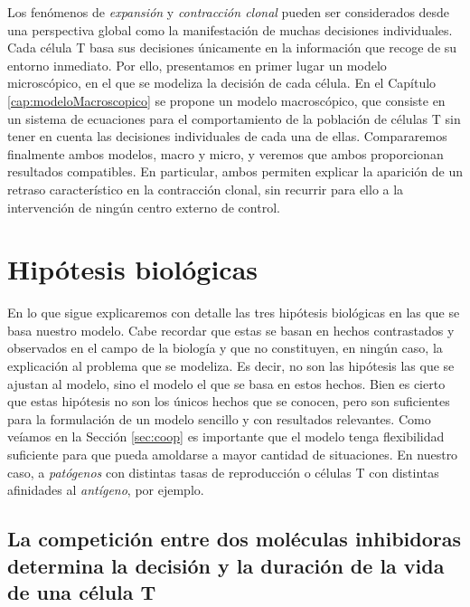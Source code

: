 Los fenómenos de \textit{expansión} y \textit{contracción clonal} pueden ser considerados desde una perspectiva global como la manifestación de muchas decisiones individuales. Cada célula T basa sus decisiones únicamente en la información que recoge de su entorno inmediato. Por ello, presentamos en primer lugar un modelo microscópico, en el que se modeliza la decisión de cada célula. En el Capítulo \ref{cap:modeloMacroscopico} se propone un modelo macroscópico, que consiste en un sistema de ecuaciones para el comportamiento de la población de células T sin tener en cuenta  las decisiones individuales de cada una de ellas. Compararemos finalmente ambos modelos, macro y micro,  y veremos que ambos proporcionan resultados  compatibles. En particular, ambos permiten explicar la aparición de un retraso característico en la contracción clonal, sin recurrir para ello a la intervención de ningún centro externo de control.


 
\section{Hipótesis biológicas} 
\label{sec:hip_bio}

En lo que sigue explicaremos con detalle las tres hipótesis biológicas en las que se basa nuestro modelo. Cabe recordar que estas se basan en hechos contrastados y observados en el campo de la biología y que no constituyen, en ningún caso, la explicación al problema que se modeliza. Es decir, no son las hipótesis las que se ajustan al modelo, sino el modelo el que se basa en estos hechos.
Bien es cierto que estas hipótesis no son los únicos hechos que se conocen, pero son suficientes para la formulación de un modelo sencillo y con resultados relevantes. Como veíamos en la Sección \ref{sec:coop} es importante que el modelo tenga flexibilidad suficiente para que pueda amoldarse a mayor cantidad de situaciones. En nuestro caso, a \textit{patógenos} con distintas tasas de reproducción o células T con distintas afinidades al \textit{antígeno}, por ejemplo. 

\subsection{La competición entre dos moléculas inhibidoras determina la decisión y la duración de la vida de una célula T}
\label{subsec:hip_1}
	 
